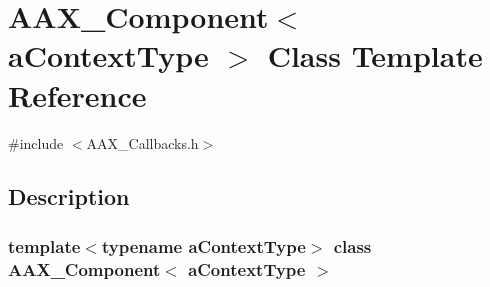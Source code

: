 \hypertarget{a01437}{}\section{A\+A\+X\+\_\+\+Component$<$ a\+Context\+Type $>$ Class Template Reference}
\label{a01437}


{\ttfamily \#include $<$A\+A\+X\+\_\+\+Callbacks.\+h$>$}



\subsection{Description}
\subsubsection*{template$<$typename a\+Context\+Type$>$\newline
class A\+A\+X\+\_\+\+Component$<$ a\+Context\+Type $>$}

